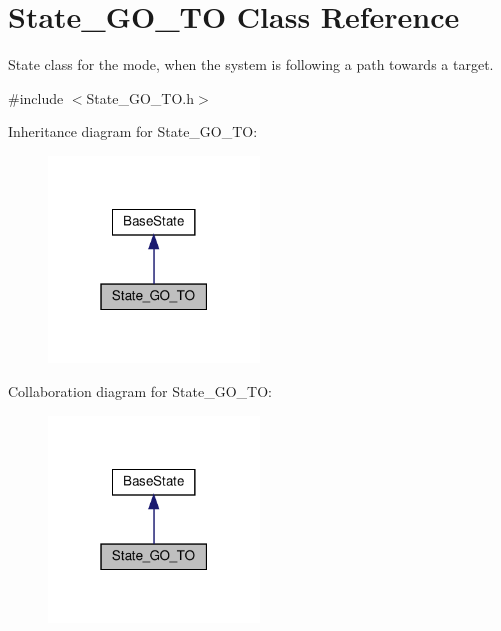 \hypertarget{class_state___g_o___t_o}{}\section{State\+\_\+\+G\+O\+\_\+\+TO Class Reference}
\label{class_state___g_o___t_o}


State class for the mode, when the system is following a path towards a target.  




{\ttfamily \#include $<$State\+\_\+\+G\+O\+\_\+\+T\+O.\+h$>$}



Inheritance diagram for State\+\_\+\+G\+O\+\_\+\+TO\+:
\nopagebreak
\begin{figure}[H]
\begin{center}
\leavevmode
\includegraphics[width=159pt]{class_state___g_o___t_o__inherit__graph}
\end{center}
\end{figure}


Collaboration diagram for State\+\_\+\+G\+O\+\_\+\+TO\+:
\nopagebreak
\begin{figure}[H]
\begin{center}
\leavevmode
\includegraphics[width=159pt]{class_state___g_o___t_o__coll__graph}
\end{center}
\end{figure}
